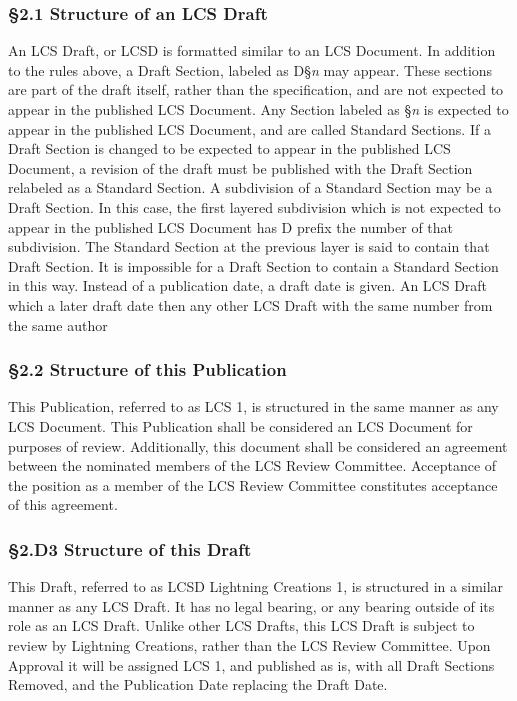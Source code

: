 \documentclass[
]{article}
\begin{document}
\hypertarget{structure-of-an-lcs-draft}{%
\subsubsection{§2.1 Structure of an LCS
Draft}\label{structure-of-an-lcs-draft}}

An LCS Draft, or LCSD is formatted similar to an LCS Document. In
addition to the rules above, a Draft Section, labeled as D§\emph{n} may
appear. These sections are part of the draft itself, rather than the
specification, and are not expected to appear in the published LCS
Document. Any Section labeled as §\emph{n} is expected to appear in the
published LCS Document, and are called Standard Sections. If a Draft
Section is changed to be expected to appear in the published LCS
Document, a revision of the draft must be published with the Draft
Section relabeled as a Standard Section. A subdivision of a Standard
Section may be a Draft Section. In this case, the first layered
subdivision which is not expected to appear in the published LCS
Document has D prefix the number of that subdivision. The Standard
Section at the previous layer is said to contain that Draft Section. It
is impossible for a Draft Section to contain a Standard Section in this
way. Instead of a publication date, a draft date is given. An LCS Draft
which a later draft date then any other LCS Draft with the same number
from the same author

\hypertarget{structure-of-this-publication}{%
\subsubsection{§2.2 Structure of this
Publication}\label{structure-of-this-publication}}

This Publication, referred to as LCS 1, is structured in the same manner
as any LCS Document. This Publication shall be considered an LCS
Document for purposes of review. Additionally, this document shall be
considered an agreement between the nominated members of the LCS Review
Committee. Acceptance of the position as a member of the LCS Review
Committee constitutes acceptance of this agreement.

\hypertarget{d3-structure-of-this-draft}{%
\subsubsection{§2.D3 Structure of this
Draft}\label{d3-structure-of-this-draft}}

This Draft, referred to as LCSD Lightning Creations 1, is structured in
a similar manner as any LCS Draft. It has no legal bearing, or any
bearing outside of its role as an LCS Draft. Unlike other LCS Drafts,
this LCS Draft is subject to review by Lightning Creations, rather than
the LCS Review Committee. Upon Approval it will be assigned LCS 1, and
published as is, with all Draft Sections Removed, and the Publication
Date replacing the Draft Date.
\end{document}
